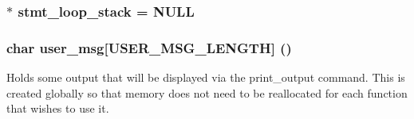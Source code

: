 \subsubsection{$\ast$ {\bf stmt\_\-loop\_\-stack} = NULL}\label{statement_8c_a0}


\subsubsection{\setlength{\rightskip}{0pt plus 5cm}char {\bf user\_\-msg}[USER\_\-MSG\_\-LENGTH] ()}\label{statement_8c_a1}


Holds some output that will be displayed via the print\_\-output command. This is created globally so that memory does not need to be reallocated for each function that wishes to use it. 